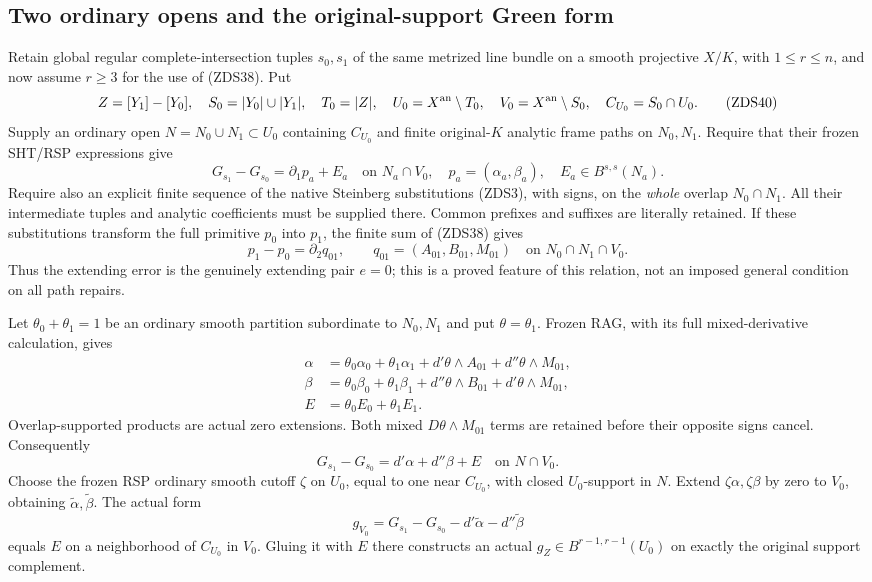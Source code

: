 \subsection{Two ordinary opens and the original-support Green form}

Retain global regular complete-intersection tuples $s_0,s_1$ of
the same metrized line bundle on a smooth projective $X/K$,
with $1\le r\le n$, and now assume $r\ge3$ for the use of
(ZDS38).  Put
\[
 Z=[Y_1]-[Y_0],\quad S_0=|Y_0|\cup|Y_1|,\quad T_0=|Z|,
 \quad U_0=X^{\rm an}\setminus T_0,\quad
 V_0=X^{\rm an}\setminus S_0,\quad C_{U_0}=S_0\cap U_0.
 \tag{ZDS40}
\]
Supply an ordinary open $N=N_0\cup N_1\subset U_0$ containing
$C_{U_0}$ and finite original-$K$ analytic frame paths on $N_0,N_1$.
Require that their frozen SHT/RSP expressions give
\[
 G_{s_1}-G_{s_0}=\partial_1p_a+E_a\quad\text{on }N_a\cap V_0,
 \quad p_a=(\alpha_a,\beta_a),\quad E_a\in B^{s,s}(N_a).
 \tag{ZDS41}
\]
Require also an explicit finite sequence of the native Steinberg
substitutions (ZDS3), with signs, on the \emph{whole} overlap
$N_0\cap N_1$.  All their intermediate tuples and analytic
coefficients must be supplied there.  Common prefixes and suffixes
are literally retained.  If these substitutions transform the full
primitive $p_0$ into $p_1$, the finite sum of (ZDS38) gives
\[
 p_1-p_0=\partial_2q_{01},\qquad
 q_{01}=(A_{01},B_{01},M_{01})\quad\text{on }N_0\cap N_1\cap V_0.
 \tag{ZDS42}
\]
Thus the extending error is the genuinely extending pair $e=0$;
this is a proved feature of this relation, not an imposed general
condition on all path repairs.

Let $\theta_0+\theta_1=1$ be an ordinary smooth partition
subordinate to $N_0,N_1$ and put $\theta=\theta_1$.  Frozen RAG,
with its full mixed-derivative calculation, gives
\[
 \begin{split}
 \alpha&=\theta_0\alpha_0+\theta_1\alpha_1
                   +d'\theta\wedge A_{01}+d''\theta\wedge M_{01},\\
 \beta&=\theta_0\beta_0+\theta_1\beta_1
                   +d''\theta\wedge B_{01}+d'\theta\wedge M_{01},\\
 E&=\theta_0E_0+\theta_1E_1.
 \end{split}
 \tag{ZDS43}
\]
Overlap-supported products are actual zero extensions.  Both mixed
$D\theta\wedge M_{01}$ terms are retained before their opposite
signs cancel.  Consequently
\[
 G_{s_1}-G_{s_0}=d'\alpha+d''\beta+E\quad\text{on }N\cap V_0.
 \tag{ZDS44}
\]
Choose the frozen RSP ordinary smooth cutoff $\zeta$ on $U_0$,
equal to one near $C_{U_0}$, with closed $U_0$-support in $N$.
Extend $\zeta\alpha,\zeta\beta$ by zero to $V_0$, obtaining
$\widetilde\alpha,\widetilde\beta$.  The actual form
\[
 g_{V_0}=G_{s_1}-G_{s_0}
                   -d'\widetilde\alpha-d''\widetilde\beta
 \tag{ZDS45}
\]
equals $E$ on a neighborhood of $C_{U_0}$ in $V_0$.  Gluing it
with $E$ there constructs an actual $g_Z\in B^{r-1,r-1}(U_0)$
on exactly the original support complement.

